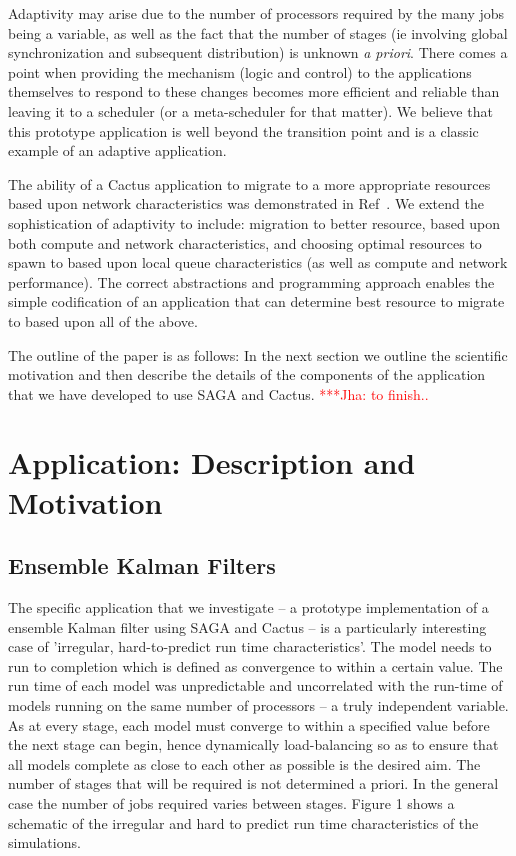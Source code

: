 \documentclass[conference,final]{IEEEtran}
\newcommand{\jhanote}[1]{ {\textcolor{red} { ***Jha: #1 }}}
\newcommand{\jhanote}[1]{}
\begin{document}
Adaptivity may arise due to the number of processors required by the
many jobs being a variable, as well as the fact that the number of
stages (ie involving global synchronization and subsequent
distribution) is unknown {\it a priori}. There comes a point when
providing the mechanism (logic and control) to the applications
themselves to respond to these changes becomes more efficient and
reliable than leaving it to a scheduler (or a meta-scheduler for that
matter). We believe that this prototype application is well beyond the
transition point and is a classic example of an adaptive application.

The ability of a Cactus application to migrate to a more appropriate
resources based upon network characteristics was demonstrated in
Ref~\cite{escience07}.  We extend the sophistication of adaptivity to
include: migration to better resource, based upon both compute and
network characteristics, and choosing optimal resources to spawn to
based upon local queue characteristics (as well as compute and network
performance). The correct abstractions and programming approach
enables the simple codification of an application that can determine
best resource to migrate to based upon all of the above.

The outline of the paper is as follows: In the next section we outline
the scientific motivation and then describe the details of the
components of the application that we have developed to use SAGA and
Cactus.  \jhanote{to finish..}

\section{Application: Description and Motivation} 


\subsection{Ensemble Kalman Filters}


The specific application that we investigate -- a prototype
implementation of a ensemble Kalman filter using SAGA and Cactus -- is
a particularly interesting case of 'irregular, hard-to-predict run
time characteristics'.  The model needs to run to completion which is
defined as convergence to within a certain value.  The run time of
each model was unpredictable and uncorrelated with the run-time of
models running on the same number of processors -- a truly
independent variable.  As at every stage, each model must converge to
within a specified value before the next stage can begin, hence
dynamically load-balancing so as to ensure that all models complete as
close to each other as possible is the desired aim.  The number of
stages that will be required is not determined a priori. In the
general case the number of jobs required varies between stages.
Figure 1 shows a schematic of the irregular and hard to predict run
time characteristics of the simulations.
\end{document}
